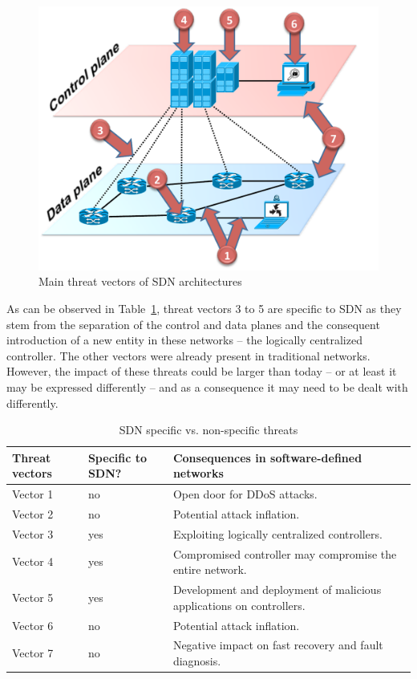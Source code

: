 \begin{figure}[t!]
\centering
\includegraphics[width=0.85\columnwidth]{figures/fig9_sdn_threat_vectors.pdf}
\caption{Main threat vectors of SDN architectures}
\label{fig:threatvectorsmap}
\end{figure}

As can be observed in Table~\ref{tab:newandoldproblems}, threat vectors 3 to 5 are specific to SDN as they 
stem from the separation of the control and data planes and the consequent introduction of a new entity in 
these networks -- the logically centralized controller. The other vectors were already present 
in traditional networks. However, the impact of these threats could be larger than today -- or at least it 
may be expressed differently -- and as a consequence it may need to be dealt with differently.


{\renewcommand{\arraystretch}{1.4}
\begin{table}[!ht]
\caption{SDN specific vs. non-specific threats}
\label{tab:newandoldproblems}
\begin{center}
\footnotesize
\begin{tabularx}{\linewidth}{p{1.2cm}p{1.2cm}X}
\hline
\textbf{Threat vectors}  & \textbf{Specific to SDN?}  & \textbf{Consequences in software-defined networks} \\\hline
Vector 1      & no      & Open door for DDoS attacks.\\\hline
Vector 2      & no      & Potential attack inflation.\\\hline
Vector 3      & yes     & Exploiting logically centralized controllers.\\\hline
Vector 4      & yes     & Compromised controller may compromise the entire network.\\\hline
Vector 5      & yes     & Development and deployment of malicious applications on controllers. \\\hline
Vector 6      & no      & Potential attack inflation.\\\hline
Vector 7      & no      & Negative impact on fast recovery and fault diagnosis.\\
\hline
\end{tabularx}
\end{center}
\end{table}
}

